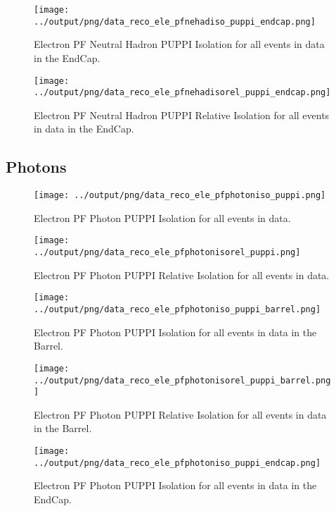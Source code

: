 \documentclass[11pt]{book}
\begin{document}
\begin{figure}[htb]
\centering
\texttt{[image: ../output/png/data\_reco\_ele\_pfnehadiso\_puppi\_endcap.png]}
\caption{Electron PF Neutral Hadron PUPPI Isolation for all events in data in the EndCap.}
\label{fig:data_ele_pfnehadiso_puppi_endcap}
\end{figure}

\begin{figure}[htb]
\centering
\texttt{[image: ../output/png/data\_reco\_ele\_pfnehadisorel\_puppi\_endcap.png]}
\caption{Electron PF Neutral Hadron PUPPI Relative Isolation for all events in data in the EndCap.}
\label{fig:data_ele_pfnehadisorel_puppi_endcap}
\end{figure}
\clearpage

\subsection{Photons}
\begin{figure}[htb]
\centering
\texttt{[image: ../output/png/data\_reco\_ele\_pfphotoniso\_puppi.png]}
\caption{Electron PF Photon PUPPI Isolation for all events in data.}
\label{fig:data_ele_pfphotoniso_puppi}
\end{figure}

\begin{figure}[htb]
\centering
\texttt{[image: ../output/png/data\_reco\_ele\_pfphotonisorel\_puppi.png]}
\caption{Electron PF Photon PUPPI Relative Isolation for all events in data.}
\label{fig:data_ele_pfphotonisorel_puppi}
\end{figure}

\begin{figure}[htb]
\centering
\texttt{[image: ../output/png/data\_reco\_ele\_pfphotoniso\_puppi\_barrel.png]}
\caption{Electron PF Photon PUPPI Isolation for all events in data in the Barrel.}
\label{fig:data_ele_pfphotoniso_puppi_barrel}
\end{figure}

\begin{figure}[htb]
\centering
\texttt{[image: ../output/png/data\_reco\_ele\_pfphotonisorel\_puppi\_barrel.png]}
\caption{Electron PF Photon PUPPI Relative Isolation for all events in data in the Barrel.}
\label{fig:data_ele_pfphotonisorel_puppi_barrel}
\end{figure}

\begin{figure}[htb]
\centering
\texttt{[image: ../output/png/data\_reco\_ele\_pfphotoniso\_puppi\_endcap.png]}
\caption{Electron PF Photon PUPPI Isolation for all events in data in the EndCap.}
\label{fig:data_ele_pfphotoniso_puppi_endcap}
\end{figure}
\end{document}
